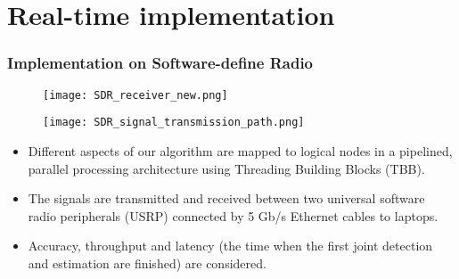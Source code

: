 \section{Real-time implementation}



\begin{frame}
    \frametitle{Implementation on Software-define Radio}

    \begin{figure}
        \centering
        \begin{minipage}{.5\textwidth}
          \centering
          \texttt{[image: SDR\_receiver\_new.png]}
        \end{minipage}%
        \begin{minipage}{.5\textwidth}
          \centering
          \texttt{[image: SDR\_signal\_transmission\_path.png]}
        \end{minipage}
    \end{figure}

    \begin{itemize}
        \item Different aspects of our algorithm are mapped to logical nodes in a pipelined, parallel processing architecture using Threading Building Blocks (TBB).
        \item The signals are transmitted and received between two universal software radio peripherals (USRP) connected by 5 Gb/s Ethernet cables to
        laptops.
        \item Accuracy, throughput and latency (the time when the first joint detection and estimation are finished) are considered. 
    \end{itemize}
  \end{frame}


